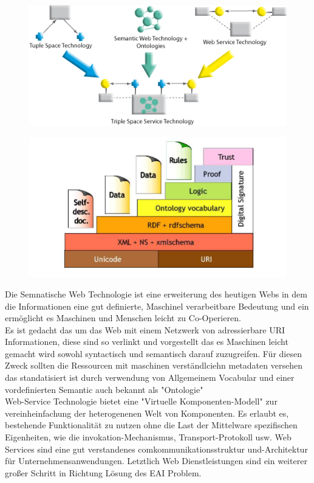 \documentclass[a4paper,12pt]{scrreprt}
\begin{document}
\begin{figure}[h]
\centering
\includegraphics[width=0.7\linewidth]{./tripcom_overview2}
\caption{}
\label{fig:tripcom_overview2}
\end{figure}
\begin{figure}[h]
\centering
\includegraphics[width=0.7\linewidth]{./Semantic_Web_www_tripcom_org_docs_coordination07_paper}
\caption{}
\label{fig:Semantic_Web_www_tripcom_org_docs_coordination07_paper}
\end{figure}
		
		
	
		
		Die Semnatische Web Technologie ist eine erweiterung des heutigen Webs in dem die Informationen eine gut definierte, Maschinel verarbeitbare Bedeutung und ein ermöglicht es Maschinen und Menschen leicht zu Co-Operieren.\\
		Es ist gedacht das um das Web mit einem Netzwerk von adressierbare URI Informationen, diese sind so verlinkt und vorgestellt das es Maschinen leicht gemacht wird sowohl syntactisch und semantisch darauf zuzugreifen.
		Für diesen Zweck sollten die Ressourcen mit maschinen verständlciehn metadaten versehen das standatisiert ist durch verwendung von Allgemeinem Vocabular und einer vordefinierten Semantic auch bekannt als "Ontologie"
		\\
	

		
			
		
		
		Web-Service Technologie bietet eine 
		"Virtuelle Komponenten-Modell" zur vereinheinfachung der 
		heterogenenen Welt von Komponenten. Es  erlaubt es, bestehende Funktionalität zu nutzen 
		ohne die Last der Mittelware spezifischen Eigenheiten, wie die invokation-Mechanismus, Transport-Protokoll usw. Web Services sind eine gut verstandenes comkommunikationsstruktur und-Architektur für Unternehmensanwendungen. Letztlich Web 
		Dienstleistungen sind ein weiterer großer Schritt in Richtung 
		Lösung des EAI Problem.
		
\end{document}
